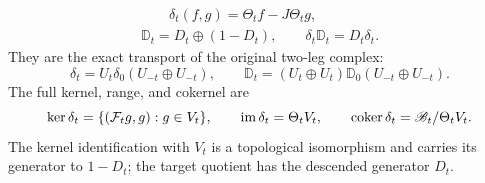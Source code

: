 \begin{hdtproposition}
\begin{equation}
\begin{gathered}
 \qquad\delta_t(f,g)=\Theta_tf-J\Theta_tg,\\
 \mathbb D_t=D_t\oplus(1-D_t),
 \qquad\delta_t\mathbb D_t=D_t\delta_t.
 \end{gathered}
\end{equation}
They are the exact transport of the original two-leg complex:
\begin{equation}\label{hdt:wt:eq:two-leg-conjugacy}
 \delta_t=U_t\delta_0(U_{-t}\oplus U_{-t}),\qquad
 \mathbb D_t=(U_t\oplus U_t)\mathbb D_0
                         (U_{-t}\oplus U_{-t}).
\end{equation}
The full kernel, range, and cokernel are
\begin{equation}\label{hdt:wt:eq:two-leg-kernel}
 \ker\delta_t=\{(\mathcal F_tg,g):g\in V_t\},\qquad
 \operatorname{im}\delta_t=\Theta_tV_t,\qquad
 \operatorname{coker}\delta_t=\mathscr B_t/\Theta_tV_t.
\end{equation}
The kernel identification with $V_t$ is a topological isomorphism
and carries its generator to $1-D_t$; the target quotient has
the descended generator $D_t$.
\end{hdtproposition}

